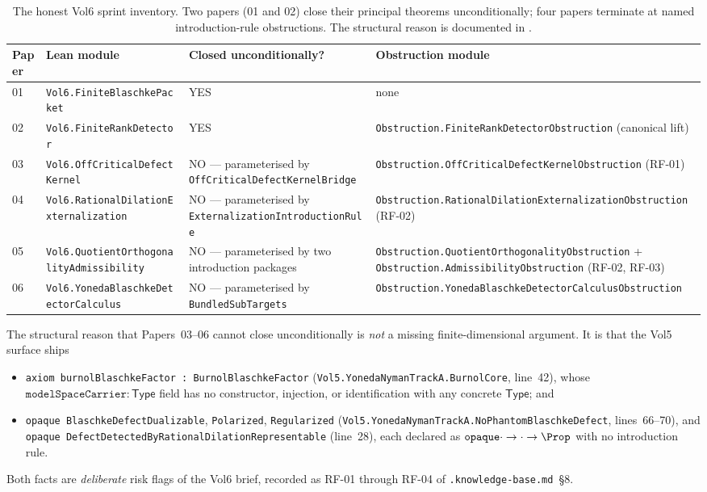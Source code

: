 \documentclass[11pt]{article}
\theoremstyle{plain}
\theoremstyle{definition}
\theoremstyle{remark}
\newcommand{\code}[1]{\texttt{#1}}
\newcommand{\Type}{\mathsf{Type}}
\begin{document}
\begin{table}[h]
\centering
\small
\begin{tabular}{@{}l l l l@{}}
\toprule
Paper & Lean module
      & Closed unconditionally?
      & Obstruction module \\
\midrule
01 & \code{Vol6.FiniteBlaschkePacket}
   & YES
   & none \\
02 & \code{Vol6.FiniteRankDetector}
   & YES
   & \code{Obstruction.FiniteRankDetectorObstruction} (canonical lift) \\
03 & \code{Vol6.OffCriticalDefectKernel}
   & NO --- parameterised by
     \code{OffCriticalDefectKernelBridge}
   & \code{Obstruction.OffCriticalDefectKernelObstruction} (RF-01) \\
04 & \code{Vol6.RationalDilationExternalization}
   & NO --- parameterised by
     \code{ExternalizationIntroductionRule}
   & \code{Obstruction.RationalDilationExternalizationObstruction} (RF-02) \\
05 & \code{Vol6.QuotientOrthogonalityAdmissibility}
   & NO --- parameterised by two introduction packages
   & \code{Obstruction.QuotientOrthogonalityObstruction} +
     \code{Obstruction.AdmissibilityObstruction} (RF-02, RF-03) \\
06 & \code{Vol6.YonedaBlaschkeDetectorCalculus}
   & NO --- parameterised by \code{BundledSubTargets}
   & \code{Obstruction.YonedaBlaschkeDetectorCalculusObstruction} \\
\bottomrule
\end{tabular}
\caption{The honest Vol6 sprint inventory. Two papers (01 and 02)
close their principal theorems unconditionally; four papers terminate
at named introduction-rule obstructions. The structural reason is
documented in .}
\label{tab:honest-inventory}
\end{table}

The structural reason that Papers~03--06 cannot close unconditionally
is \emph{not} a missing finite-dimensional argument. It is that the
Vol5 surface ships
\begin{itemize}[leftmargin=2em]
  \item \code{axiom burnolBlaschkeFactor : BurnolBlaschkeFactor}
        (\code{Vol5.YonedaNymanTrackA.BurnolCore}, line~42), whose
        \(\code{modelSpaceCarrier} : \Type\) field has no constructor,
        injection, or identification with any concrete
        \(\Type\); and
  \item \code{opaque BlaschkeDefectDualizable}, \code{Polarized},
        \code{Regularized} (\code{Vol5.YonedaNymanTrackA.NoPhantomBlaschkeDefect},
        lines~66--70), and \code{opaque
        DefectDetectedByRationalDilationRepresentable}
        (line~28), each declared as \(\code{opaque} \cdot \to \cdot
        \to \Prop\) with no introduction rule.
\end{itemize}
Both facts are \emph{deliberate} risk flags of the Vol6 brief, recorded
as RF-01 through RF-04 of \code{.knowledge-base.md}~\S8.
\end{document}
